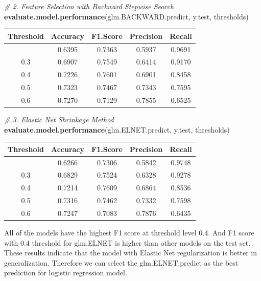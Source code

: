 \documentclass[
  10pt,
  paper=a4,
  ,captions=tableheading
]{scrartcl}
\newenvironment{Shaded}{\begin{snugshade}}{\end{snugshade}}
\newcommand{\CommentTok}[1]{\textcolor[rgb]{0.56,0.35,0.01}{\textit{#1}}}
\newcommand{\FunctionTok}[1]{\textcolor[rgb]{0.13,0.29,0.53}{\textbf{#1}}}
\newcommand{\NormalTok}[1]{#1}
\begin{document}
\begin{Shaded}
\begin{Highlighting}[]
\CommentTok{\# 2. Feature Selection with Backward Stepwise Search}
\FunctionTok{evaluate.model.performance}\NormalTok{(glm.BACKWARD.predict, y.test, thresholds)}
\end{Highlighting}
\end{Shaded}

\begin{longtable}[]{@{}ccccc@{}}
\toprule\noalign{}
Threshold & Accuracy & F1.Score & Precision & Recall \\
\midrule\noalign{}
\endhead
\bottomrule\noalign{}
\endlastfoot
0.2 & 0.6395 & 0.7363 & 0.5937 & 0.9691 \\
0.3 & 0.6907 & 0.7549 & 0.6414 & 0.9170 \\
0.4 & 0.7226 & 0.7601 & 0.6901 & 0.8458 \\
0.5 & 0.7323 & 0.7467 & 0.7343 & 0.7595 \\
0.6 & 0.7270 & 0.7129 & 0.7855 & 0.6525 \\
\end{longtable}

\begin{Shaded}
\begin{Highlighting}[]
\CommentTok{\# 3. Elastic Net Shrinkage Method}
\FunctionTok{evaluate.model.performance}\NormalTok{(glm.ELNET.predict, y.test, thresholds)}
\end{Highlighting}
\end{Shaded}

\begin{longtable}[]{@{}ccccc@{}}
\toprule\noalign{}
Threshold & Accuracy & F1.Score & Precision & Recall \\
\midrule\noalign{}
\endhead
\bottomrule\noalign{}
\endlastfoot
0.2 & 0.6266 & 0.7306 & 0.5842 & 0.9748 \\
0.3 & 0.6829 & 0.7524 & 0.6328 & 0.9278 \\
0.4 & 0.7214 & 0.7609 & 0.6864 & 0.8536 \\
0.5 & 0.7316 & 0.7462 & 0.7332 & 0.7598 \\
0.6 & 0.7247 & 0.7083 & 0.7876 & 0.6435 \\
\end{longtable}

\small

All of the models have the highest F1 score at threshold level 0.4. And
F1 score with 0.4 threshold for glm.ELNET is higher than other models on
the test set. These results indicate that the model with Elastic Net
regularization is better in generalization. Therefore we can select the
glm.ELNET.predict as the best prediction for logistic regression model.
\end{document}
